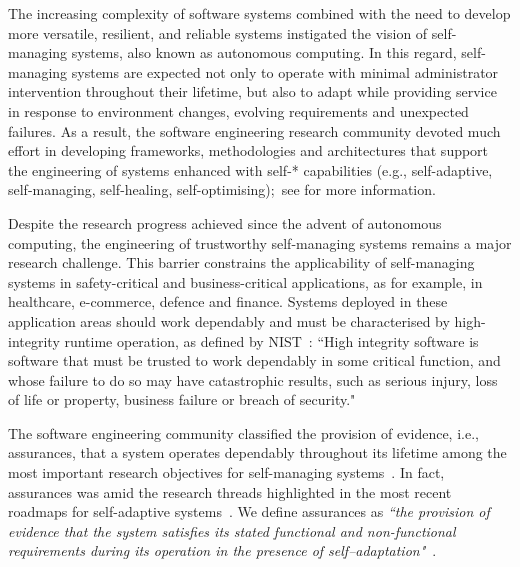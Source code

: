 
The increasing complexity of software systems combined with the need to develop more versatile, resilient, and reliable systems instigated the vision of self-managing systems, also known as autonomous computing\cite{Kephart2003:Comp, Ganek2003:IBM}. In this regard, self-managing systems are expected not only to operate with minimal administrator intervention throughout their lifetime, but also to adapt while providing service in response to environment changes, evolving requirements and unexpected failures. As a result, the software engineering research community devoted much effort in developing frameworks, methodologies and architectures that support the engineering of systems enhanced with self-* capabilities (e.g., self-adaptive, self-managing, self-healing, self-optimising);~see \cite{Salehie2009:TAAS, Huebscher2008:ACM} for more information. 

Despite the research progress achieved since the advent of autonomous computing, the engineering of trustworthy self-managing systems remains a major research challenge. This barrier constrains the applicability of self-managing systems in safety-critical and business-critical applications, as for example, in healthcare, e-commerce, defence and finance. Systems deployed in these application areas should work dependably and must be characterised by high-integrity runtime operation, as defined by NIST~\cite{NIST}: ``High integrity software is software that must be trusted to work dependably in some critical function, and whose failure to do so may have catastrophic results, such as serious injury, loss of life or property, business failure or breach of security."

The software engineering community classified the provision of evidence, i.e., assurances, that a system operates dependably throughout its lifetime among the most important research objectives for self-managing systems~\cite{Cheng2009:Dagstuhl}. In fact, assurances was amid the research threads highlighted in the most recent roadmaps for self-adaptive systems~\cite{Lemos2013:Dagstuhl, Lemos2014:Dagstuhl}. We define assurances as \textit{``the provision of evidence that the system satisfies its stated functional and non-functional requirements during its operation in the presence of self--adaptation"}~\cite{Lemos2014:Dagstuhl}.

